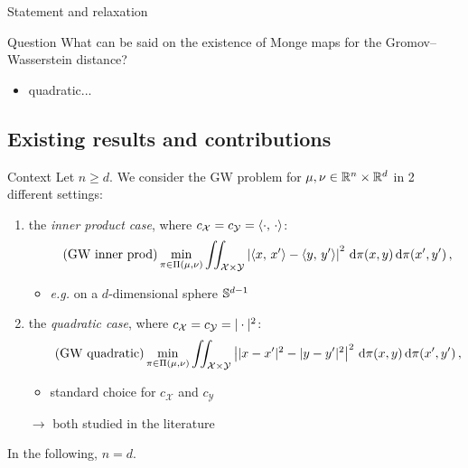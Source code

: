 \documentclass[9pt,xcolor={dvipsnames}]{beamer}
\begin{document}
\begin{frame}{Statement and relaxation}

    \begin{block}{Question}
        What can be said on the existence of Monge maps for the Gromov--Wasserstein distance?
    \end{block}

    \begin{itemize}
        \item quadratic...
    \end{itemize}

    \end{frame}

\subsection{Existing results and contributions}
\begin{frame}{Context}
    Let $n\geq d$. We consider the GW problem for $\mu,\nu\in\mathbb{R}^n\times\mathbb{R}^d$ in 2 different settings:
    \begin{enumerate}
        \item the \emph{inner product case}, where $c_{\mathcal{X}}=c_{\mathcal{Y}}=\langle\cdot,\,\cdot\rangle$:
            \begin{equation}
                \tag{GW inner prod}
                \min _{\pi \in \Pi(\mu, \nu)} \iint_{\mathcal{X}\times\mathcal{Y}}\left|\langle x,\, x'\rangle-\langle y,\, y'\rangle\right|^{2} \,\mathrm d\pi(x, y) \,\mathrm d\pi(x', y')\,,
                \label{eqn:GW-inner-prod}
            \end{equation}
            \begin{itemize}
                \item \textit{e.g.} on a $d$-dimensional sphere $\mathbb{S}^{d-1}$
            \end{itemize}
            \item the \emph{quadratic case}, where $c_{\mathcal{X}}=c_{\mathcal{Y}}=|\cdot|^2$:
            \begin{equation}
                \tag{GW quadratic}
                \min _{\pi \in \Pi(\mu, \nu)} \iint_{\mathcal{X}\times\mathcal{Y}}\left||x-x'|^2-|y-y'|^2\right|^{2} \,\mathrm d\pi(x, y) \,\mathrm d\pi(x', y')\,,
                \label{eqn:GW-quadratic}
            \end{equation}
            \begin{itemize}
                \item standard choice for $c_{\mathcal{X}}$ and $c_{\mathcal{Y}}$
            \end{itemize}
            \item[$\to$] both studied in the literature \cite{alvarez2019towards,vayer2020contribution}
        \end{enumerate}
        In the following, $n=d$.
\end{frame}
\end{document}
